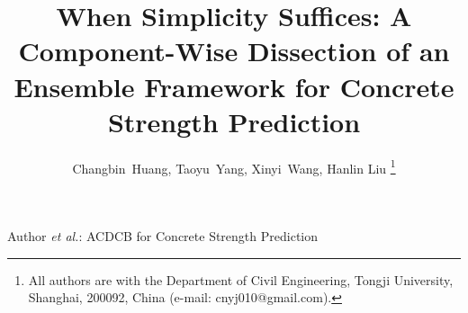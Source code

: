 \documentclass[journal]{IEEEtran}
\begin{document}
\title{When Simplicity Suffices: A Component-Wise Dissection of an Ensemble Framework for Concrete Strength Prediction}

\author{Changbin~Huang, Taoyu~Yang, Xinyi~Wang, Hanlin Liu %
\thanks{All authors are with the Department of Civil Engineering, Tongji University, Shanghai, 200092, China (e-mail: cnyj010@gmail.com).}}

%
{Author \MakeLowercase{\textit{et al.}}: ACDCB for Concrete Strength Prediction}

\maketitle

\begin{abstract}

\end{abstract}
\end{document}
